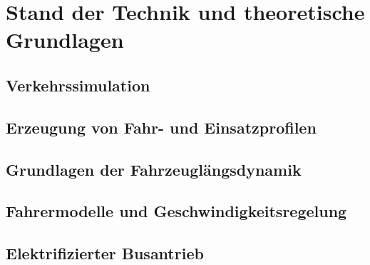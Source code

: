 \chapter{Stand der Technik und theoretische Grundlagen}

\section{Verkehrssimulation}

\section{Erzeugung von Fahr- und Einsatzprofilen}

\section{Grundlagen der Fahrzeuglängsdynamik}

\section{Fahrermodelle und Geschwindigkeitsregelung}

\section{Elektrifizierter Busantrieb}